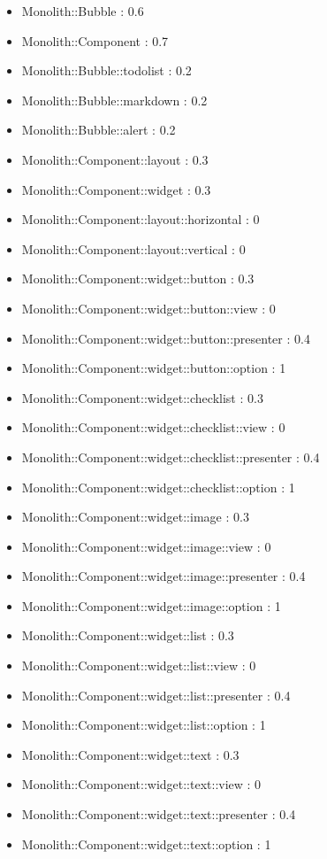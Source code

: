 \begin{itemize}
\item Monolith::Bubble : 0.6
\item Monolith::Component : 0.7
\item Monolith::Bubble::todolist : 0.2
\item Monolith::Bubble::markdown : 0.2
\item Monolith::Bubble::alert : 0.2
\item Monolith::Component::layout : 0.3
\item Monolith::Component::widget : 0.3
\item Monolith::Component::layout::horizontal : 0
\item Monolith::Component::layout::vertical : 0
\item Monolith::Component::widget::button : 0.3
\item Monolith::Component::widget::button::view : 0
\item Monolith::Component::widget::button::presenter : 0.4
\item Monolith::Component::widget::button::option : 1
\item Monolith::Component::widget::checklist : 0.3
\item Monolith::Component::widget::checklist::view : 0
\item Monolith::Component::widget::checklist::presenter : 0.4
\item Monolith::Component::widget::checklist::option : 1
\item Monolith::Component::widget::image : 0.3
\item Monolith::Component::widget::image::view : 0
\item Monolith::Component::widget::image::presenter : 0.4
\item Monolith::Component::widget::image::option : 1
\item Monolith::Component::widget::list : 0.3
\item Monolith::Component::widget::list::view : 0
\item Monolith::Component::widget::list::presenter : 0.4
\item Monolith::Component::widget::list::option : 1
\item Monolith::Component::widget::text : 0.3
\item Monolith::Component::widget::text::view : 0
\item Monolith::Component::widget::text::presenter : 0.4
\item Monolith::Component::widget::text::option : 1
\end{itemize}

